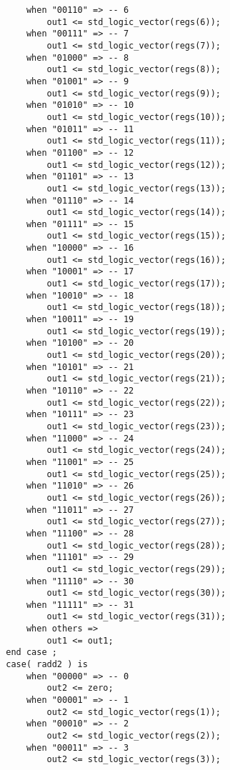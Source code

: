 \documentclass[a4paper]{article}
\begin{document}
\begin{lstlisting}
            when "00110" => -- 6
                out1 <= std_logic_vector(regs(6));
            when "00111" => -- 7
                out1 <= std_logic_vector(regs(7));
            when "01000" => -- 8
                out1 <= std_logic_vector(regs(8));
            when "01001" => -- 9
                out1 <= std_logic_vector(regs(9));
            when "01010" => -- 10
                out1 <= std_logic_vector(regs(10));
            when "01011" => -- 11
                out1 <= std_logic_vector(regs(11));
            when "01100" => -- 12
                out1 <= std_logic_vector(regs(12));
            when "01101" => -- 13
                out1 <= std_logic_vector(regs(13));
            when "01110" => -- 14
                out1 <= std_logic_vector(regs(14));
            when "01111" => -- 15
                out1 <= std_logic_vector(regs(15));
            when "10000" => -- 16
                out1 <= std_logic_vector(regs(16));
            when "10001" => -- 17
                out1 <= std_logic_vector(regs(17));
            when "10010" => -- 18
                out1 <= std_logic_vector(regs(18));
            when "10011" => -- 19
                out1 <= std_logic_vector(regs(19));
            when "10100" => -- 20
                out1 <= std_logic_vector(regs(20));
            when "10101" => -- 21
                out1 <= std_logic_vector(regs(21));
            when "10110" => -- 22
                out1 <= std_logic_vector(regs(22));
            when "10111" => -- 23
                out1 <= std_logic_vector(regs(23));
            when "11000" => -- 24
                out1 <= std_logic_vector(regs(24));
            when "11001" => -- 25
                out1 <= std_logic_vector(regs(25));
            when "11010" => -- 26
                out1 <= std_logic_vector(regs(26));
            when "11011" => -- 27
                out1 <= std_logic_vector(regs(27));
            when "11100" => -- 28
                out1 <= std_logic_vector(regs(28));
            when "11101" => -- 29
                out1 <= std_logic_vector(regs(29));
            when "11110" => -- 30
                out1 <= std_logic_vector(regs(30));
            when "11111" => -- 31
                out1 <= std_logic_vector(regs(31));
            when others =>
                out1 <= out1;
        end case ;
        case( radd2 ) is
            when "00000" => -- 0
                out2 <= zero;
            when "00001" => -- 1
                out2 <= std_logic_vector(regs(1));
            when "00010" => -- 2
                out2 <= std_logic_vector(regs(2));
            when "00011" => -- 3
                out2 <= std_logic_vector(regs(3));

\end{lstlisting}
\end{document}
